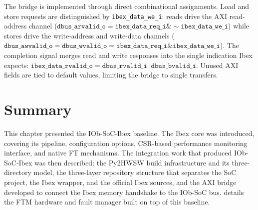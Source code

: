 The bridge is implemented through direct combinational assignments. Load and store requests are distinguished by \texttt{ibex\_data\_we\_i}: reads drive the \ac{AXI} read-address channel ($\texttt{dbus\_arvalid\_o} = \texttt{ibex\_data\_req\_i} \mathbin{\&} \sim\texttt{ibex\_data\_we\_i}$) while stores drive the write-address and write-data channels ($\texttt{dbus\_awvalid\_o} = \texttt{dbus\_wvalid\_o} = \texttt{ibex\_data\_req\_i} \mathbin{\&} \texttt{ibex\_data\_we\_i}$). The completion signal merges read and write responses into the single indication Ibex expects: $\texttt{ibex\_data\_rvalid\_o} = \texttt{dbus\_rvalid\_i} \mathbin{||} \texttt{dbus\_bvalid\_i}$. Unused \ac{AXI} fields are tied to default values, limiting the bridge to single transfers.


\section{Summary}
\label{chap5:summary}

This chapter presented the IOb-SoC-Ibex baseline. The Ibex core was introduced, covering its pipeline, configuration options, \ac{CSR}-based performance monitoring interface, and native \ac{FT} mechanisms. The integration work that produced IOb-SoC-Ibex was then described: the Py2HWSW build infrastructure and its three-directory model, the three-layer repository structure that separates the \ac{SoC} project, the Ibex wrapper, and the official Ibex sources, and the \ac{AXI} bridge developed to connect the Ibex memory handshake to the IOb-SoC bus.  details the \ac{FTM} hardware and fault manager built on top of this baseline.





